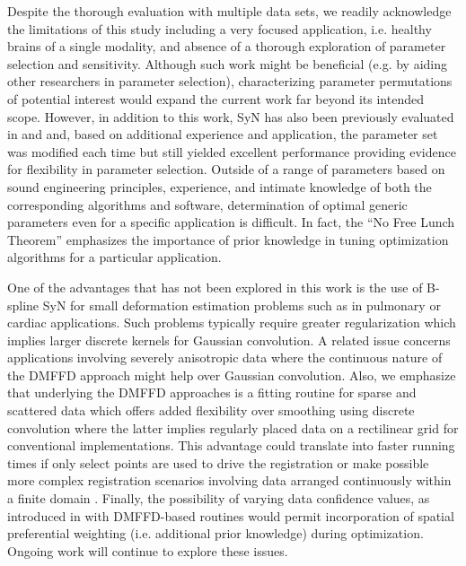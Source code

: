 \documentclass{frontiersSCNS}
\begin{document}
Despite the thorough evaluation with multiple data sets, we readily 
acknowledge the limitations of this study including a very focused application,
i.e. healthy brains of a single modality, and absence of a thorough 
exploration of parameter selection and sensitivity.  Although such 
work might be beneficial (e.g. by aiding other researchers in parameter
selection), characterizing parameter permutations 
of potential interest would expand the current work far beyond its 
intended scope.  However, in addition to this work,
SyN has also been previously evaluated in \cite{klein2009} and 
\cite{avants2011} and, based on additional experience and application,
the parameter set was modified each time but still yielded excellent
performance providing evidence for flexibility in parameter selection.
Outside of a range of parameters based on
sound engineering principles, experience, and intimate knowledge of both the 
corresponding algorithms and software, determination of optimal generic
parameters even for a specific application is difficult.  In fact, the
``No Free Lunch Theorem'' \cite{wolpert1997} 
emphasizes the importance of prior knowledge in tuning optimization 
algorithms for a particular application.

One of the advantages that has not been explored in this work is 
the use of B-spline SyN for small deformation estimation problems such 
as in pulmonary or cardiac applications.  Such problems typically require
greater regularization which implies larger discrete kernels for 
Gaussian convolution.
A related issue concerns applications involving severely anisotropic data where
the continuous nature of the DMFFD approach might help over Gaussian 
convolution.  Also, we emphasize that underlying the DMFFD approaches 
is a fitting routine for sparse and scattered data which offers added flexibility
over smoothing using discrete convolution where
the latter implies regularly placed  data on a rectilinear grid for conventional
implementations.  This advantage could translate into faster running times if
only select points are used to drive the registration or make possible more
complex registration scenarios
involving data arranged continuously within a finite domain \cite[e.g.][]{tustison2011}.
Finally, the possibility of varying data confidence values, as introduced in \cite{tustison2006} with DMFFD-based routines
would permit incorporation of spatial preferential weighting (i.e. additional 
prior knowledge) during optimization.
Ongoing work will continue to explore these issues.
\end{document}
